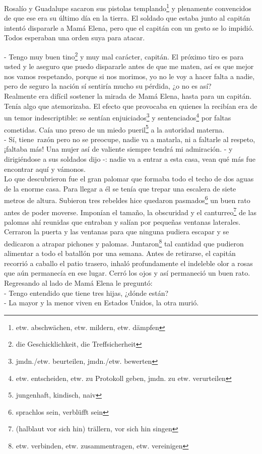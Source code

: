 Rosalío y Guadalupe sacaron sus pistolas templando\footnote{etw. abschwächen, etw. mildern, etw. dämpfen}
y plenamente convencidos de que ese era su último día en la tierra.
El soldado que estaba junto al capitán intentó dispararle a Mamá Elena,
pero que el capitán con un gesto se lo impidió. Todos esperaban una
orden suya para atacar.

- Tengo muy buen tino\footnote{die Geschicklichkeit, die Treffsicherheit} %
y muy mal carácter, capitán. El próximo tiro es para usted y le aseguro que %
puedo dispararle antes de que me maten, así es que mejor nos vamos %
respetando, porque si nos morimos, yo no le voy a hacer falta a nadie, %
pero de seguro la nación sí sentiría mucho su pérdida, ¿o no es así?\\

Realmente era difícil sostener la mirada de Mamá Elena, hasta para un
capitán. Tenía algo que atemorizaba. El efecto que provocaba en quienes
la recibían era de un temor indescriptible: se sentían enjuiciados\footnote{jmdn./etw. beurteilen, jmdn./etw. bewerten} y sentenciados\footnote{etw. entscheiden, etw. zu Protokoll geben, jmdn. zu etw. verurteilen}
por faltas cometidas. Caía uno preso de un miedo pueril\footnote{jungenhaft, kindisch, naiv}
a la autoridad materna.
\\- Sí, tiene~razón pero no se preocupe, nadie va a matarla, ni a %
faltarle al respeto, ¡faltaba más! Una mujer así de valiente siempre %
tendrá mi admiración. - y dirigiéndose a sus soldados dijo -: nadie va a %
entrar a esta casa, vean qué más fue encontrar aquí y vámonos.\\

Lo que descubrieron fue el gran palomar que formaba todo el techo de
dos aguas de la enorme casa. Para llegar a él se tenía que trepar una
escalera de siete metros de altura. Subieron tres rebeldes hice quedaron pasmados\footnote{sprachlos sein, verblüfft sein} un buen rato
antes de poder moverse. Imponían el tamaño, la obscuridad y el canturreo\footnote{(halblaut vor sich hin) trällern, vor sich hin singen}
de las palomas ahí reunidas que entraban y salían por pequeñas ventanas
laterales. Cerraron la puerta y las ventanas para que ninguna pudiera escapar
y se dedicaron a atrapar pichones y palomas.
 Juntaron\footnote{etw. verbinden, etw. zusammentragen, etw. vereinigen}
tal cantidad que pudieron alimentar a todo el batallón por una
semana. Antes de retirarse, el capitán recorrió a caballo el patio
trasero, inhaló profundamente el indeleble olor a rosas que aún
permanecía en ese lugar. Cerró los ojos y así permaneció un buen rato.
Regresando al lado de Mamá Elena le preguntó:
\\- Tengo entendido que tiene tres hijas, ¿dónde están? %
\\- La mayor y la menor viven en Estados Unidos, la otra murió.\\

